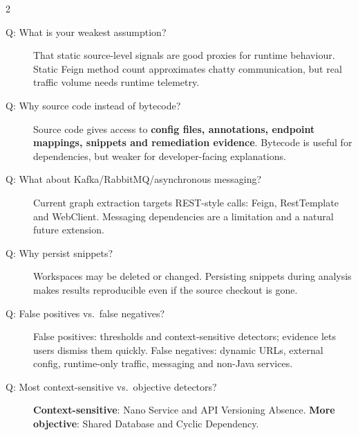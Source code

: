 \documentclass[10pt,a4paper]{article}
\begin{document}
\begin{multicols}{2}
\begin{description}
    \item[Q: What is your weakest assumption?]
    That static source-level signals are good proxies for runtime behaviour. Static Feign method count approximates chatty communication, but real traffic volume needs runtime telemetry.

    \item[Q: Why source code instead of bytecode?]
    Source code gives access to \textbf{config files, annotations, endpoint mappings, snippets and remediation evidence}. Bytecode is useful for dependencies, but weaker for developer-facing explanations.

    \item[Q: What about Kafka/RabbitMQ/asynchronous messaging?]
    Current graph extraction targets REST-style calls: Feign, RestTemplate and WebClient. Messaging dependencies are a limitation and a natural future extension.


    \item[Q: Why persist snippets?]
    Workspaces may be deleted or changed. Persisting snippets during analysis makes results reproducible even if the source checkout is gone.

    \item[Q: False positives vs.\ false negatives?]
    False positives: thresholds and context-sensitive detectors; evidence lets users dismiss them quickly. False negatives: dynamic URLs, external config, runtime-only traffic, messaging and non-Java services.

    \item[Q: Most context-sensitive vs.\ objective detectors?]
    \textbf{Context-sensitive}: Nano Service and API Versioning Absence. \textbf{More objective}: Shared Database and Cyclic Dependency.




\end{description}
\end{multicols}
\end{document}
